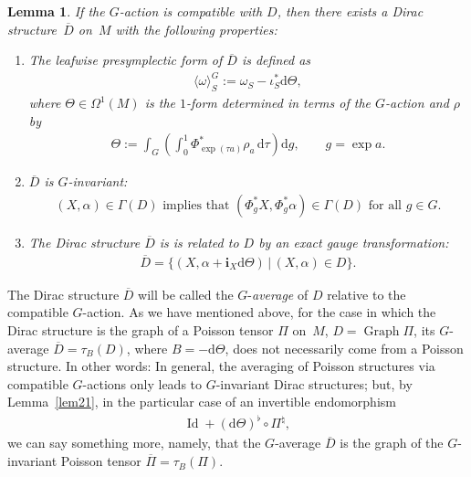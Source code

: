 \documentclass[pdftex]{sigma}
\numberwithin{equation}{section}
\newtheorem{Lemma}[Theorem]{Lemma}
\begin{document}
\begin{Lemma}\label{lema22}
If the $G$-action is compatible with $D$, then there exists a Dirac structure~$\overline{D}$ on~$M$ with the following properties:
\begin{enumerate}[$(a)$]\itemsep=0pt
\item The leafwise presymplectic form of $\overline{D}$ is defined as
\begin{gather*}
\langle \omega \rangle^{G}_S:=\omega_S -\iota^*_S \mathrm{d}\Theta,
\end{gather*}
where $\Theta\in\Omega^{1}(M)$ is the $1$-form determined in terms of the $G$-action and $\rho$ by
\begin{gather}
\Theta:=\int_G \left(
\int^1_0 \Phi_{\exp(\tau a)}^{\ast}\rho_{a}\,\mathrm{d}\tau\right) \mathrm{d}g,\qquad g=\exp a.\label{MF}
\end{gather}
\item $\overline{D}$ is $G$-invariant:
\begin{gather*}
(X,\alpha)\in\Gamma(D)\mbox{ implies that }(\Phi_{g}^{\ast}X,\Phi_{g}^{\ast} \alpha)\in\Gamma(D)\mbox{ for all }g\in G.
\end{gather*}
\item The Dirac structure $\overline{D}$ is is related to $D$ by an exact gauge transformation:
\begin{gather*}
\overline{D}=\{(X,\alpha+\mathbf{i}_{X}\mathrm{d}\Theta)\,|\, (X,\alpha)\in D\}.
\end{gather*}
\end{enumerate}
\end{Lemma}

The Dirac structure $\overline{D}$ will be called the $G$-\emph{average} of $D$ relative to the compatible $G$-action. As we have mentioned above, for the case in which the Dirac structure is the graph of a Poisson tensor $\Pi$ on~$M$, $D=\operatorname*{Graph}\Pi$, its $G$-average $\overline{D}=\tau_{B}(D)$, where $B=-\mathrm{d}\Theta$, does not necessarily come from a Poisson structure. In other words: In general, the averaging of Poisson structures via compatible $G$-actions only leads to $G$-invariant Dirac structures; but, by Lemma~\ref{lem21}, in the particular case of an invertible endomorphism
\begin{gather*}
\operatorname{Id}+(\mathrm{d}\Theta)^{\flat}\circ\Pi^{\natural},
\end{gather*}
we can say something more, namely, that the $G$-average $\overline{D}$ is the graph of the $G$-invariant Poisson tensor $\overline{\Pi}=\tau_{B}(\Pi)$.
\end{document}
